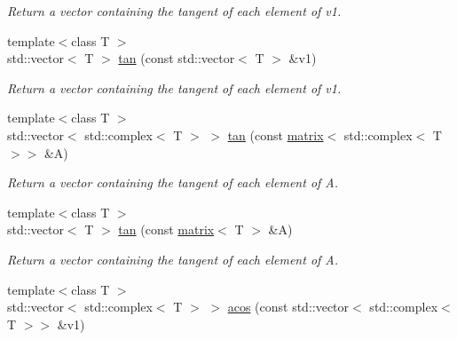 \begin{DoxyCompactItemize}
\begin{DoxyCompactList}\small\item\em Return a vector containing the tangent of each element of v1. \end{DoxyCompactList}\item 
\hypertarget{namespacekeycpp_ae4fe8a3edd9841d208cc044f79d48ae2}{{\footnotesize template$<$class T $>$ }\\std\-::vector$<$ T $>$ \hyperlink{namespacekeycpp_ae4fe8a3edd9841d208cc044f79d48ae2}{tan} (const std\-::vector$<$ T $>$ \&v1)}\label{namespacekeycpp_ae4fe8a3edd9841d208cc044f79d48ae2}

\begin{DoxyCompactList}\small\item\em Return a vector containing the tangent of each element of v1. \end{DoxyCompactList}\item 
\hypertarget{namespacekeycpp_a6a91266a8d14f0ae2de1d3e098d05e41}{{\footnotesize template$<$class T $>$ }\\std\-::vector$<$ std\-::complex$<$ T $>$ $>$ \hyperlink{namespacekeycpp_a6a91266a8d14f0ae2de1d3e098d05e41}{tan} (const \hyperlink{classkeycpp_1_1matrix}{matrix}$<$ std\-::complex$<$ T $>$$>$ \&A)}\label{namespacekeycpp_a6a91266a8d14f0ae2de1d3e098d05e41}

\begin{DoxyCompactList}\small\item\em Return a vector containing the tangent of each element of A. \end{DoxyCompactList}\item 
\hypertarget{namespacekeycpp_aa8cf9e0ed2f49b902c93be19ea6ef147}{{\footnotesize template$<$class T $>$ }\\std\-::vector$<$ T $>$ \hyperlink{namespacekeycpp_aa8cf9e0ed2f49b902c93be19ea6ef147}{tan} (const \hyperlink{classkeycpp_1_1matrix}{matrix}$<$ T $>$ \&A)}\label{namespacekeycpp_aa8cf9e0ed2f49b902c93be19ea6ef147}

\begin{DoxyCompactList}\small\item\em Return a vector containing the tangent of each element of A. \end{DoxyCompactList}\item 
\hypertarget{namespacekeycpp_a08fac66d81dbcfce4d57bd08b3810dbf}{{\footnotesize template$<$class T $>$ }\\std\-::vector$<$ std\-::complex$<$ T $>$ $>$ \hyperlink{namespacekeycpp_a08fac66d81dbcfce4d57bd08b3810dbf}{acos} (const std\-::vector$<$ std\-::complex$<$ T $>$$>$ \&v1)}\label{namespacekeycpp_a08fac66d81dbcfce4d57bd08b3810dbf}


\end{DoxyCompactItemize}
